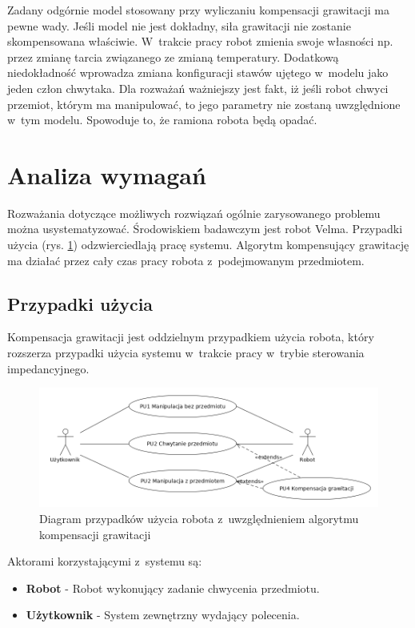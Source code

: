Zadany odgórnie model stosowany przy wyliczaniu kompensacji grawitacji ma pewne wady. Jeśli model nie jest dokładny, siła grawitacji nie zostanie skompensowana właściwie. W~trakcie pracy robot zmienia swoje własności np. przez zmianę tarcia związanego ze zmianą temperatury. Dodatkową niedokładność wprowadza zmiana konfiguracji stawów ujętego w~modelu jako jeden człon chwytaka.  Dla rozważań ważniejszy jest fakt, iż jeśli robot chwyci przemiot, którym ma manipulować, to jego parametry nie zostaną uwzględnione w~tym modelu. Spowoduje to, że ramiona robota będą opadać.

\section{Analiza wymagań}
Rozważania dotyczące możliwych rozwiązań ogólnie zarysowanego problemu można usystematyzować. Środowiskiem badawczym jest robot Velma. Przypadki użycia (rys. \ref{fig:usecase}) odzwierciedlają pracę systemu. Algorytm kompensujący grawitację ma działać przez cały czas pracy robota z~podejmowanym przedmiotem. 
\subsection{Przypadki użycia}
Kompensacja grawitacji jest oddzielnym przypadkiem  użycia robota, który rozszerza przypadki użycia systemu w~trakcie pracy w~trybie sterowania impedancyjnego.

\begin{figure}[H]
	\centering
	\includegraphics[width=.9\textwidth]{images/usecase.png}
	\caption{Diagram przypadków użycia robota z~uwzględnieniem algorytmu kompensacji grawitacji}
	\label{fig:usecase}
\end{figure}


Aktorami korzystającymi z~systemu są:
\begin{itemize}
	\item \textbf{Robot} - Robot wykonujący zadanie chwycenia przedmiotu.
	\item \textbf{Użytkownik} - System zewnętrzny wydający polecenia.
\end{itemize}


